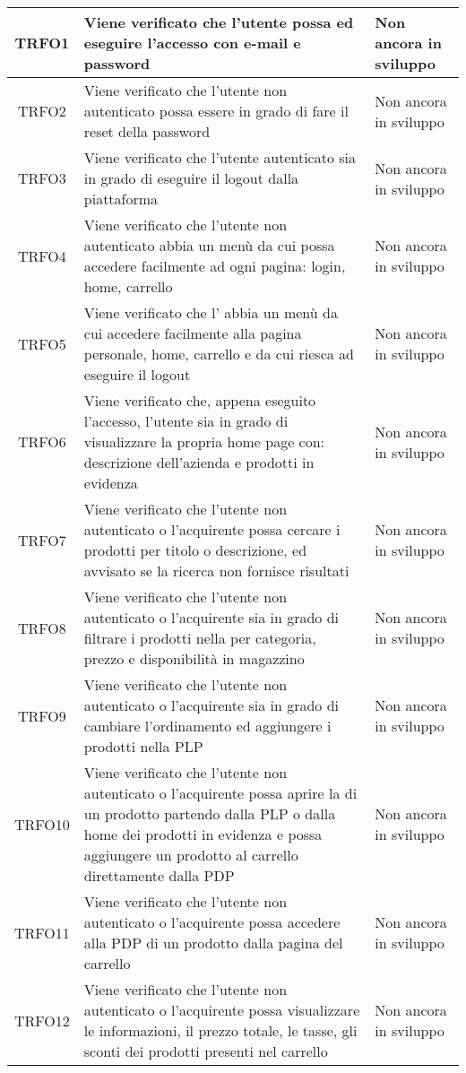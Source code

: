 \begin{longtable}{|c| C{10cm} |C{3cm}|}
	TRFO1 & Viene verificato che l'utente possa  ed eseguire l'accesso con e-mail e password & Non ancora in sviluppo \\ \hline
	TRFO2 & Viene verificato che l'utente non autenticato possa essere in grado di fare il reset della password & Non ancora in sviluppo \\ \hline
	TRFO3 & Viene verificato che l'utente autenticato sia in grado di eseguire il logout dalla piattaforma & Non ancora in sviluppo \\ \hline
	TRFO4 & Viene verificato che l'utente non autenticato abbia un menù da cui possa accedere facilmente ad ogni pagina: login, home, carrello & Non ancora in sviluppo \\ \hline
	TRFO5 & Viene verificato che l' abbia un menù da cui accedere facilmente alla pagina personale, home, carrello e da cui riesca ad eseguire il logout & Non ancora in sviluppo \\ \hline
	TRFO6 & Viene verificato che, appena eseguito l'accesso, l'utente sia in grado di visualizzare la propria home page con: descrizione dell'azienda e prodotti in evidenza & Non ancora in sviluppo \\ \hline
	TRFO7 & Viene verificato che l'utente non autenticato o l'acquirente possa cercare i prodotti per titolo o descrizione, ed avvisato se la ricerca non fornisce risultati & Non ancora in sviluppo \\ \hline
	TRFO8 & Viene verificato che l'utente non autenticato o l'acquirente sia in grado di filtrare i prodotti nella  per categoria, prezzo e disponibilità in magazzino & Non ancora in sviluppo \\ \hline
	TRFO9 & Viene verificato che l'utente non autenticato o l'acquirente sia in grado di cambiare l'ordinamento ed aggiungere i prodotti nella PLP & Non ancora in sviluppo \\ \hline
	TRFO10 & Viene verificato che l'utente non autenticato o l'acquirente possa aprire la  di un prodotto partendo dalla PLP o dalla home dei prodotti in evidenza e possa aggiungere un prodotto al carrello direttamente dalla PDP & Non ancora in sviluppo \\ \hline
	TRFO11 & Viene verificato che l'utente non autenticato o l'acquirente possa accedere alla PDP di un prodotto dalla pagina del carrello & Non ancora in sviluppo \\ \hline
    TRFO12 & Viene verificato che l'utente non autenticato o l'acquirente possa visualizzare le informazioni, il prezzo totale, le tasse, gli sconti dei prodotti presenti nel carrello & Non ancora in sviluppo \\ \hline

\end{longtable}
